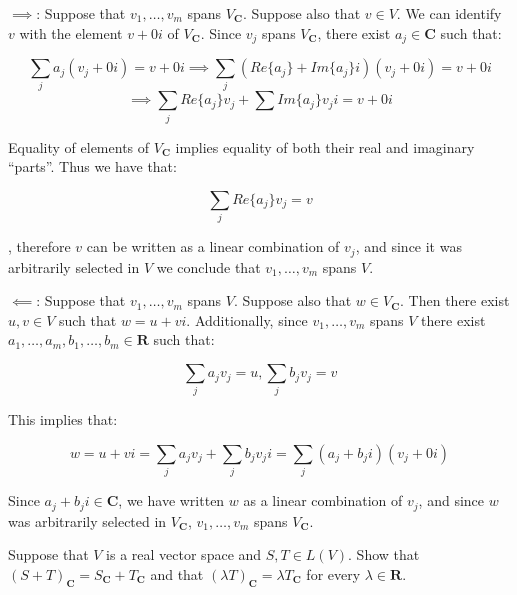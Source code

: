 \begin{solution}

    $\implies$: Suppose that $v_1, \ldots, v_m$ spans $V_\mathbf{C}$. Suppose also that $v \in V$. We can identify $v$ with the element $v+0i$ of $V_\mathbf{C}$. Since $v_j$ spans $V_\mathbf{C}$, there exist $a_j \in \mathbf{C}$ such that:
    
    $$\sum_j a_j (v_j + 0i) = v + 0i \implies \sum_j (Re\{a_j\} + Im\{a_j\}i)(v_j + 0i) = v + 0i $$
    $$\implies \sum_j Re\{a_j\}v_j + \sum Im\{a_j\}v_j i = v + 0i$$

    Equality of elements of $V_\mathbf{C}$ implies equality of both their real and imaginary ``parts''. Thus we have that:

    $$\sum_j Re\{a_j\}v_j = v$$

    , therefore $v$ can be written as a linear combination of $v_j$, and since it was arbitrarily selected in $V$ we conclude that $v_1, \ldots, v_m$ spans $V$.

    $\impliedby$: Suppose that $v_1, \ldots, v_m$ spans $V$. Suppose also that $w \in V_\mathbf{C}$. Then there exist $u, v \in V$ such that $w = u + vi$. Additionally, since $v_1, \ldots, v_m$ spans $V$ there exist $a_1, \ldots, a_m, b_1, \ldots, b_m \in \mathbf{R}$ such that:
    
    $$\sum_j a_j v_j = u, \sum_j b_j v_j = v$$

    This implies that:

    $$w = u + vi = \sum_j a_j v_j + \sum_j b_j v_j i = \sum_j (a_j + b_j i) (v_j + 0i)$$

    Since $a_j + b_j i \in \mathbf{C}$, we have written $w$ as a linear combination of $v_j$, and since $w$ was arbitrarily selected in $V_\mathbf{C}$, $v_1, \ldots, v_m$ spans $V_\mathbf{C}$.
\end{solution}

\begin{exercise}{5}
    Suppose that $V$ is a real vector space and $S, T \in L(V)$. Show that $(S+T)_\mathbf{C} = S_\mathbf{C} + T_\mathbf{C}$ and that $(\lambda T)_\mathbf{C} = \lambda T_\mathbf{C}$ for every $\lambda \in \mathbf{R}$.
\end{exercise}

